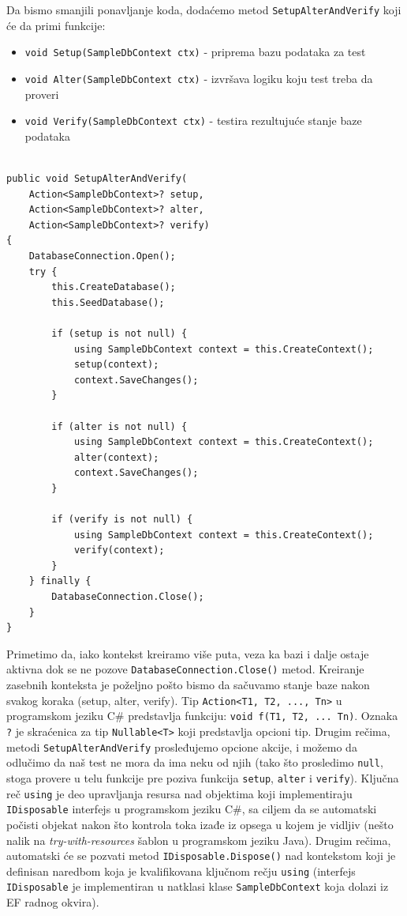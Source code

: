 Da bismo smanjili ponavljanje koda, dodaćemo metod \texttt{SetupAlterAndVerify} koji će da primi funkcije:

\begin{itemize}
\tightlist
\item
  \texttt{void\ Setup(SampleDbContext\ ctx)} - priprema bazu podataka za test
\item
  \texttt{void\ Alter(SampleDbContext\ ctx)} - izvršava logiku koju test treba da proveri
\item
  \texttt{void\ Verify(SampleDbContext\ ctx)} - testira rezultujuće stanje baze podataka
\end{itemize}

\begin{verbatim}

public void SetupAlterAndVerify(
    Action<SampleDbContext>? setup,
    Action<SampleDbContext>? alter,
    Action<SampleDbContext>? verify)
{
    DatabaseConnection.Open();
    try {
        this.CreateDatabase();
        this.SeedDatabase();

        if (setup is not null) {
            using SampleDbContext context = this.CreateContext();
            setup(context);
            context.SaveChanges();
        }

        if (alter is not null) {
            using SampleDbContext context = this.CreateContext();
            alter(context);
            context.SaveChanges();
        }

        if (verify is not null) {
            using SampleDbContext context = this.CreateContext();
            verify(context);
        }
    } finally {
        DatabaseConnection.Close();
    }
}
\end{verbatim}

Primetimo da, iako kontekst kreiramo više puta, veza ka bazi i dalje ostaje aktivna dok se ne pozove \texttt{DatabaseConnection.Close()} metod. Kreiranje zasebnih konteksta je poželjno pošto bismo da sačuvamo stanje baze nakon svakog koraka (setup, alter, verify). Tip \texttt{Action\textless{}T1,\ T2,\ ...,\ Tn\textgreater{}} u programskom jeziku C\# predstavlja funkciju: \texttt{void\ f(T1,\ T2,\ ...\ Tn)}. Oznaka \texttt{?} je skraćenica za tip \texttt{Nullable\textless{}T\textgreater{}} koji predstavlja opcioni tip. Drugim rečima, metodi \texttt{SetupAlterAndVerify} prosleđujemo opcione akcije, i možemo da odlučimo da naš test ne mora da ima neku od njih (tako što prosledimo \texttt{null}, stoga provere u telu funkcije pre poziva funkcija \texttt{setup}, \texttt{alter} i \texttt{verify}). Ključna reč \texttt{using} je deo upravljanja resursa nad objektima koji implementiraju \texttt{IDisposable} interfejs u programskom jeziku C\#, sa ciljem da se automatski počisti objekat nakon što kontrola toka izađe iz opsega u kojem je vidljiv (nešto nalik na \emph{try-with-resources} šablon u programskom jeziku Java). Drugim rečima, automatski će se pozvati metod \texttt{IDisposable.Dispose()} nad kontekstom koji je definisan naredbom koja je kvalifikovana ključnom rečju \texttt{using} (interfejs \texttt{IDisposable} je implementiran u natklasi klase \texttt{SampleDbContext} koja dolazi iz EF radnog okvira).


